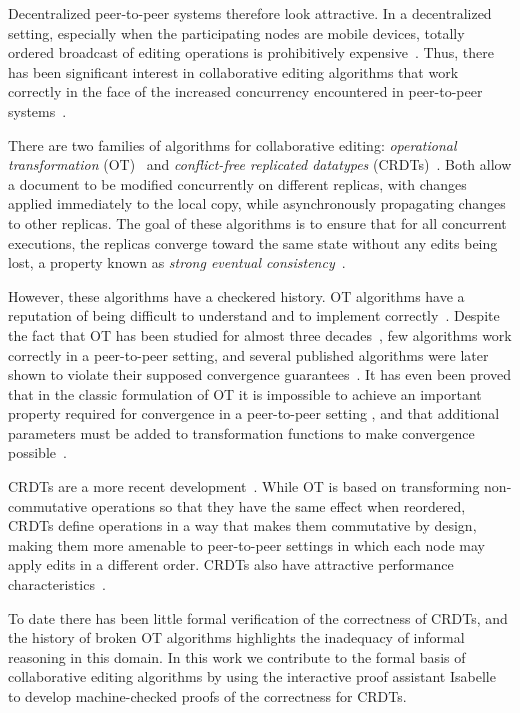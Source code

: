 \documentclass[acmlarge,review,anonymous]{acmart}\settopmatter{printfolios=true}
\begin{document}
Decentralized peer-to-peer systems therefore look attractive. In a decentralized setting, 
especially when the participating nodes are mobile devices, totally ordered broadcast of 
editing operations is prohibitively expensive~\cite{Attiya:2015dm}. Thus, there
has been significant interest in collaborative editing algorithms that work correctly in the face of
the increased concurrency encountered in peer-to-peer systems~\cite{Randolph:2015gj}.

There are two families of algorithms for collaborative editing: \emph{operational transformation}
(OT)~\cite{Ellis:1989ue,Ressel:1996wx,Oster:2006tr,Sun:1998vf,Sun:1998un,Suleiman:1998eu,Nichols:1995fd}
and \emph{conflict-free replicated datatypes}
(CRDTs)~\cite{Shapiro:2011wy,Roh:2011dw,Preguica:2009fz,Oster:2006wj,Weiss:2010hx,Nedelec:2013ky,Kleppmann:2016ve}.
Both allow a document to be modified concurrently on different replicas, with changes applied
immediately to the local copy, while asynchronously propagating changes to other replicas. The
goal of these algorithms is to ensure that for all concurrent executions, the replicas converge
toward the same state without any edits being lost, a property known as \emph{strong eventual
consistency}~\cite{Shapiro:2011un}.

However, these algorithms have a checkered history. OT algorithms have a reputation of being
difficult to understand and to implement correctly~\cite{Spiewak:2010vw}. Despite the fact that OT
has been studied for almost three decades~\cite{Ellis:1989ue}, few algorithms work correctly in a
peer-to-peer setting, and several published algorithms were later shown to violate their supposed
convergence guarantees~\cite{Imine:2003ks,Imine:2006kn}. It has even been proved that in the classic
formulation of OT it is impossible to achieve an important property required for convergence
in a peer-to-peer setting%
, and that additional parameters must be added to transformation functions
to make convergence possible~\cite{Randolph:2015gj}.

CRDTs are a more recent development~\cite{Shapiro:2011un}. While OT is based on transforming
non-commutative operations so that they have the same effect when reordered, CRDTs define operations
in a way that makes them commutative by design, making them more amenable to peer-to-peer settings
in which each node may apply edits in a different order. CRDTs also have attractive performance
characteristics~\cite{Mehdi:2011ke}.

To date there has been little formal verification of the correctness of CRDTs, and the
history of broken OT algorithms highlights the inadequacy of informal reasoning in this domain. In
this work we contribute to the formal basis of collaborative editing algorithms by using the
interactive proof assistant Isabelle to develop machine-checked proofs of the
correctness for CRDTs.
\end{document}
